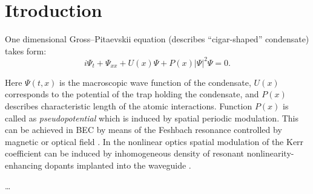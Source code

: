 \chapter*{Itroduction}

One dimensional Gross--Pitaevskii equation (describes ``cigar-shaped'' condensate) takes form:
\begin{equation}
	i \Psi_t + \Psi_{xx} + U(x) \Psi + P(x) |\Psi|^2 \Psi = 0.
\label{eq:gross-pitaevskii}
\end{equation}

Here $\Psi(t, x)$ is the macroscopic wave function of the condensate, $U(x)$ corresponds to the potential of the trap holding the condensate, and $P(x)$ describes characteristic length of the atomic interactions.
Function $P(x)$ is called as {\it pseudopotential} which is induced by spatial periodic modulation.
This can be achieved in BEC by means of the Feshbach resonance controlled by magnetic or optical field \cite{PollackDriesJunkerChenCorcovilosHulet, ChinGrimmJulienneTsienga, BauerLetterVoRempeDurr}.
In the nonlinear optics spatial modulation of the Kerr coefficient can be induced by inhomogeneous density of resonant nonlinearity-enhancing dopants implanted into the waveguide \cite{HukriedeRundeKip}.

\dots

